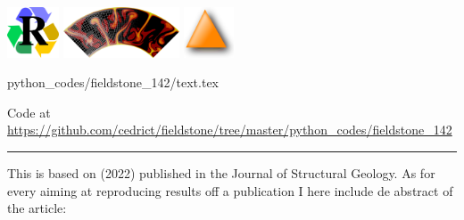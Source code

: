 
\includegraphics[height=1.5cm]{images/pictograms/replication}
\includegraphics[height=1.5cm]{images/pictograms/aspect_logo}
\includegraphics[height=1.5cm]{images/pictograms/triangle}

\begin{flushright} {\tiny {\color{gray} python\_codes/fieldstone\_142/text.tex}} \end{flushright}



\begin{center}
Code at \url{https://github.com/cedrict/fieldstone/tree/master/python_codes/fieldstone_142}
\end{center}

\par\noindent\rule{\textwidth}{0.4pt}

This \stone is based on \textcite{hams22} (2022) published in the Journal of Structural Geology.
As for every \stone aiming at reproducing results off a publication I here include de abstract
of the article:

